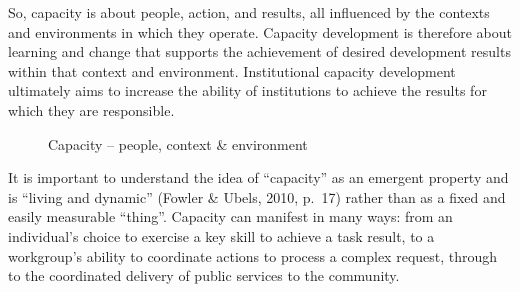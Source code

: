 \documentclass[
  10pt,
]{report}
\begin{document}
So, capacity is about people, action, and results, all influenced by the
contexts and environments in which they operate. Capacity development is
therefore about learning and change that supports the achievement of
desired development results within that context and environment.
Institutional capacity development ultimately aims to increase the
ability of institutions to achieve the results for which they are
responsible.

\begin{figure}[H]


\caption{\label{fig-Capacity-people-context-environment}Capacity --
people, context \& environment}

\end{figure}%

It is important to understand the idea of ``capacity'' as an emergent
property and is ``living and dynamic'' (Fowler \& Ubels, 2010, p.~17)
rather than as a fixed and easily measurable ``thing''. Capacity can
manifest in many ways: from an individual's choice to exercise a key
skill to achieve a task result, to a workgroup's ability to coordinate
actions to process a complex request, through to the coordinated
delivery of public services to the community.
\end{document}

